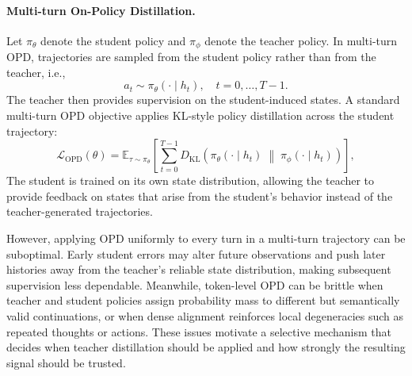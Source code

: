 \paragraph{Multi-turn On-Policy Distillation.}
Let $\pi_\theta$ denote the student policy and $\pi_\phi$ denote the teacher policy. 
%
In multi-turn OPD, trajectories are sampled from the student policy rather than from the teacher, i.e.,
\begin{equation}
    a_t \sim \pi_\theta(\cdot \mid h_t), \quad t = 0,\ldots,T-1.
\end{equation}
%
The teacher then provides supervision on the student-induced states. A standard multi-turn OPD objective applies KL-style policy distillation across the student trajectory:
\begin{equation}
    \mathcal{L}_{\mathrm{OPD}}(\theta)
    =
    \mathbb{E}_{\tau \sim \pi_\theta}
    \left[
    \sum_{t=0}^{T-1}
    D_{\mathrm{KL}}
    \left(
    \pi_\theta(\cdot \mid h_t)
    \;\middle\|\;
    \pi_\phi(\cdot \mid h_t)
    \right)
    \right],
    \label{eq:opd_loss}
\end{equation}
%
The student is trained on its own state distribution, allowing the teacher to provide feedback on states that arise from the student's behavior instead of the teacher-generated trajectories.
%

However, applying OPD uniformly to every turn in a multi-turn trajectory can be suboptimal.
%
Early student errors may alter future observations and push later histories away from the teacher's reliable state distribution, making subsequent supervision less dependable.
%
Meanwhile, token-level OPD can be brittle when teacher and student policies assign probability mass to different but semantically valid continuations, or when dense alignment reinforces local degeneracies such as repeated thoughts or actions.
%
These issues motivate a selective mechanism that decides when teacher distillation should be applied and how strongly the resulting signal should be trusted.
%


